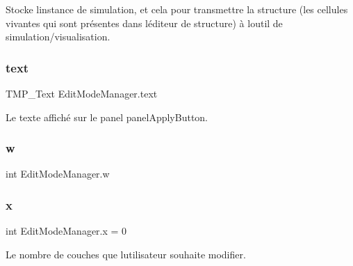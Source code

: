 Stocke l\textquotesingle{}instance de simulation, et cela pour transmettre la structure (les cellules vivantes qui sont présentes dans l\textquotesingle{}éditeur de structure) à l\textquotesingle{}outil de simulation/visualisation. 

\mbox{\label{class_edit_mode_manager_ae6fc2f251b5813fc0c75330462b9dade}} 
\subsubsection{\texorpdfstring{text}{text}}
{\footnotesize\ttfamily T\+M\+P\+\_\+\+Text Edit\+Mode\+Manager.\+text\hspace{0.3cm}{\ttfamily [private]}}



Le texte affiché sur le panel panel\+Apply\+Button. 

\mbox{\label{class_edit_mode_manager_ad9e4950cf24abf3ede8c0891c4df7b77}} 
\subsubsection{\texorpdfstring{w}{w}}
{\footnotesize\ttfamily int Edit\+Mode\+Manager.\+w\hspace{0.3cm}{\ttfamily [private]}}

\mbox{\label{class_edit_mode_manager_ab22d78b821b9c0e8a939ef89abe37f5f}} 
\subsubsection{\texorpdfstring{x}{x}}
{\footnotesize\ttfamily int Edit\+Mode\+Manager.\+x = 0\hspace{0.3cm}{\ttfamily [private]}}



Le nombre de couches que l\textquotesingle{}utilisateur souhaite modifier. 


